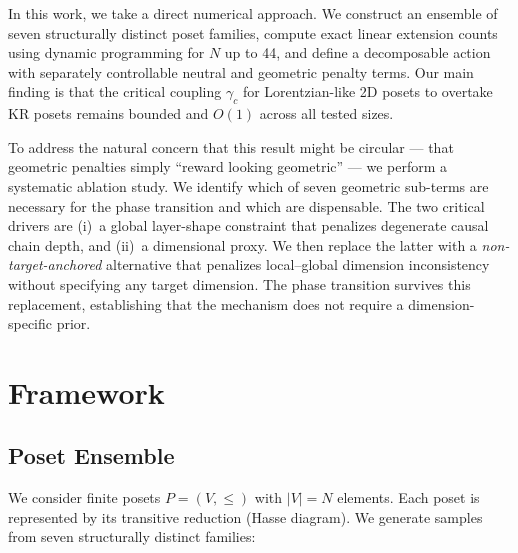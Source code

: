 \documentclass[entropy,article,submit,pdftex,moreauthors]{Definitions/mdpi}
\begin{document}
In this work, we take a direct numerical approach. We construct an ensemble of seven structurally distinct poset families, compute exact linear extension counts using dynamic programming for $N$ up to 44, and define a decomposable action with separately controllable neutral and geometric penalty terms. Our main finding is that the critical coupling $\gamma_c$ for Lorentzian-like 2D posets to overtake KR posets remains bounded and $O(1)$ across all tested sizes.

To address the natural concern that this result might be circular --- that geometric penalties simply ``reward looking geometric'' --- we perform a systematic ablation study. We identify which of seven geometric sub-terms are necessary for the phase transition and which are dispensable. The two critical drivers are (i)~a global layer-shape constraint that penalizes degenerate causal chain depth, and (ii)~a dimensional proxy. We then replace the latter with a \emph{non-target-anchored} alternative that penalizes local--global dimension inconsistency without specifying any target dimension. The phase transition survives this replacement, establishing that the mechanism does not require a dimension-specific prior.

\section{Framework}

\subsection{Poset Ensemble}

We consider finite posets $P = (V, \leq)$ with $|V| = N$ elements. Each poset is represented by its transitive reduction (Hasse diagram). We generate samples from seven structurally distinct families:
\end{document}
